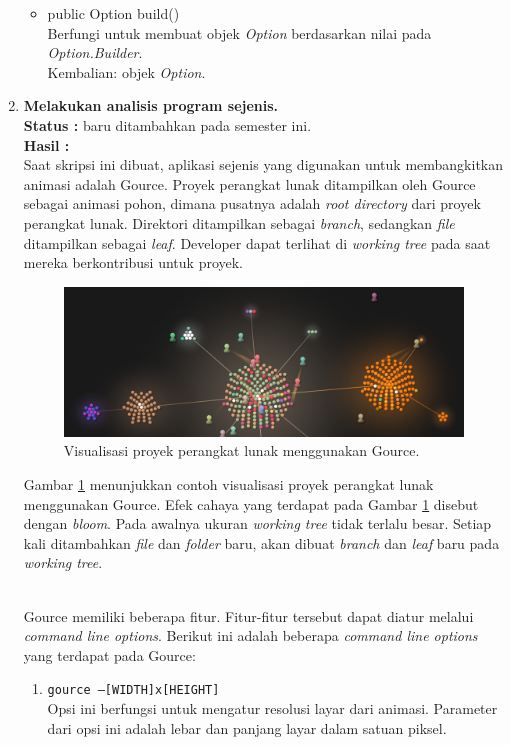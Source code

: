 \documentclass[a4paper,twoside]{article}
\begin{document}
\begin{enumerate}
\begin{itemize}
\item public Option build()\\
Berfungi untuk membuat objek \textit{Option} berdasarkan nilai pada \textit{Option.Builder}.\\
Kembalian: objek \textit{Option}.

\end{itemize}		
		
		\item \textbf{Melakukan analisis program sejenis.}\\
		{\bf Status :} baru ditambahkan pada semester ini.\\
		{\bf Hasil :} \\
	Saat skripsi ini dibuat, aplikasi sejenis yang digunakan untuk membangkitkan animasi adalah Gource.  
Proyek perangkat lunak ditampilkan oleh Gource sebagai animasi pohon, dimana pusatnya adalah \textit{root directory} dari proyek perangkat lunak\cite{Gource}. Direktori ditampilkan sebagai \textit{branch}, sedangkan \textit{file} ditampilkan sebagai \textit{leaf}. Developer dapat terlihat di \textit{working tree} pada saat mereka berkontribusi untuk proyek.

\begin{figure}[H]
	\centering
		\includegraphics[scale=0.2]{Gambar/gource.jpg}
	\caption{Visualisasi proyek perangkat lunak menggunakan Gource.}
	\label{fig:gource}
\end{figure}

Gambar \ref{fig:gource} menunjukkan contoh visualisasi proyek perangkat lunak menggunakan Gource. Efek cahaya yang terdapat pada Gambar \ref{fig:gource} disebut dengan \textit{bloom}. Pada awalnya ukuran \textit{working tree} tidak terlalu besar. Setiap kali ditambahkan \textit{file} dan \textit{folder} baru, akan dibuat \textit{branch} dan \textit{leaf} baru pada \textit{working tree}.  

\ \\
Gource memiliki beberapa fitur. Fitur-fitur tersebut dapat diatur melalui \textit{command line options}. Berikut ini adalah beberapa \textit{command line options} yang terdapat pada Gource:
\begin{enumerate}
\item \texttt{gource --[WIDTH]x[HEIGHT]}\\
Opsi ini berfungsi untuk mengatur resolusi layar dari animasi. Parameter dari opsi ini adalah lebar dan panjang layar dalam satuan piksel. 


\end{enumerate}
\end{enumerate}
\end{document}

